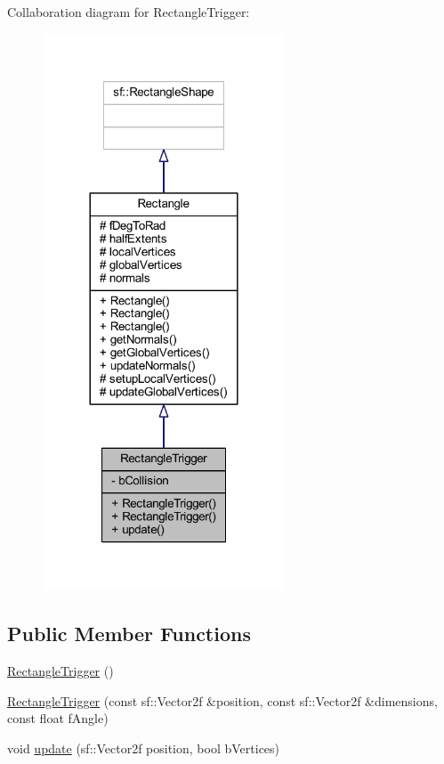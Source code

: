 Collaboration diagram for Rectangle\+Trigger\+:\nopagebreak
\begin{figure}[H]
\begin{center}
\leavevmode
\includegraphics[width=204pt]{class_rectangle_trigger__coll__graph}
\end{center}
\end{figure}
\subsection*{Public Member Functions}
\begin{DoxyCompactItemize}
\item 
\hyperlink{class_rectangle_trigger_aee7b31c4083d365353ec11edba982417}{Rectangle\+Trigger} ()
\item 
\hyperlink{class_rectangle_trigger_ad607c4f7b40934e843ddeeca15ae4f57}{Rectangle\+Trigger} (const sf\+::\+Vector2f \&position, const sf\+::\+Vector2f \&dimensions, const float f\+Angle)
\item 
void \hyperlink{class_rectangle_trigger_ab82d08742d6adba94ec85e77914e0133}{update} (sf\+::\+Vector2f position, bool b\+Vertices)
\end{DoxyCompactItemize}
